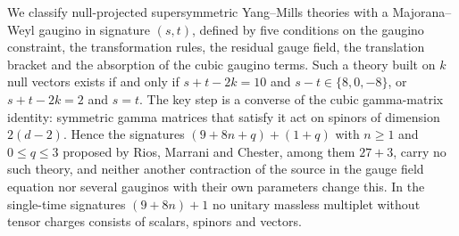 We classify null-projected supersymmetric Yang--Mills theories with a Majorana--Weyl gaugino in signature $(s,t)$, defined by five conditions on the gaugino constraint, the transformation rules, the residual gauge field, the translation bracket and the absorption of the cubic gaugino terms. Such a theory built on $k$ null vectors exists if and only if $s+t-2k=10$ and $s-t\in\{8,0,-8\}$, or $s+t-2k=2$ and $s=t$. The key step is a converse of the cubic gamma-matrix identity: symmetric gamma matrices that satisfy it act on spinors of dimension $2(d-2)$. Hence the signatures $(9+8n+q)+(1+q)$ with $n\ge1$ and $0\le q\le3$ proposed by Rios, Marrani and Chester, among them $27+3$, carry no such theory, and neither another contraction of the source in the gauge field equation nor several gauginos with their own parameters change this. In the single-time signatures $(9+8n)+1$ no unitary massless multiplet without tensor charges consists of scalars, spinors and vectors.
